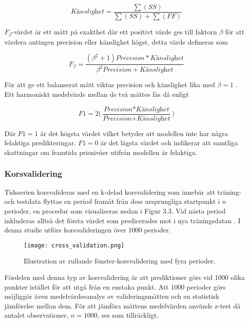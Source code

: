 \documentclass[11pt]{article}
\numberwithin{equation}{section}
\numberwithin{table}{section}
\numberwithin{figure}{section}
\begin{document}
\begin{equation}
    \textit{Känslighet} = \frac{\sum(SS)}{\sum(SS)+\sum(FF)}
\end{equation}

$F_{\beta}$-värdet är ett mått på exakthet där ett positivt värde ges till faktorn $\beta$ för att värdera antingen precision eller känslighet högst, detta värde defineras som

\begin{equation}
    F_{\beta} = \frac{(\beta^2+1) \textit{Precision} * 
    \textit{Känslighet}}{\beta^2  \textit{Precision} + \textit{Känslighet}}
\end{equation}

För att ge ett balanserat mått viktas precision och känslighet lika med $\beta=1$ \parencite{ModelValidation}. Ett harmoniskt medelvärde mellan de två måttes fås då enligt

\begin{equation}
    \textit{F1} = 2 \Big( \frac{\textit{Precision} * \textit{Känslighet}}{\textit{Precision} + \textit{Känslighet}} \Big)
\end{equation}

Där $F1=1$ är det högsta värdet vilket betyder att modellen inte har några felaktiga predikteringar. $F1=0$ är det lägsta värdet och indikerar att samtliga skattningar om framtida prisnivåer utifrån modellen är felaktiga.


\subsubsection{Korsvalidering}
Tidsserien korsvalideras med en k-delad korsvalidering som innebär att träning- och testdata flyttas en period framåt från dess ursprungliga startpunkt i $n$ perioder, en procedur som visualiseras nedan i Figur 3.3. Vid nästa period inkluderas alltså det första värdet som predicerades mot i nya träningsdatan \parencite{bergmeir2018note}. I denna studie utförs korsvalideringen över 1000 perioder. 

\begin{figure}[H]
\caption{Illustration av rullande fönster-korsvalidering med fyra perioder.}
\texttt{[image: cross\_validation.png]}
\centering
\end{figure}


Fördelen med denna typ av korsvalidering är att prediktioner görs vid 1000 olika punkter istället för att utgå från en enstaka punkt. Att 1000 perioder görs möjliggör även medelvärdesanalys av valideringsmåtten och en statistisk jämförelse mellan dem. För att jämföra måttens medelvärden används z-test då antalet observationer, $n=1000$, ses som tillräckligt.
\end{document}
